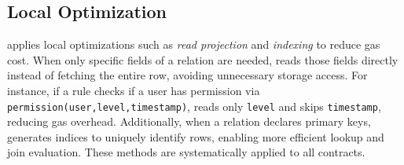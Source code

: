 \subsection{Local Optimization}
\label{ssec:old_opt}

\proto applies local optimizations such as \emph{read projection} and \emph{indexing} to reduce gas cost. When only specific fields of a relation are needed, \proto reads those fields directly instead of fetching the entire row, avoiding unnecessary storage access. For instance, if a rule checks if a user has permission via \lstinline{permission(user,level,timestamp)}, \proto reads only \lstinline{level} and skips \lstinline{timestamp}, reducing gas overhead.
Additionally, when a relation declares primary keys, \proto generates indices to uniquely identify rows, enabling more efficient lookup and join evaluation. These methods are systematically applied to all contracts.

